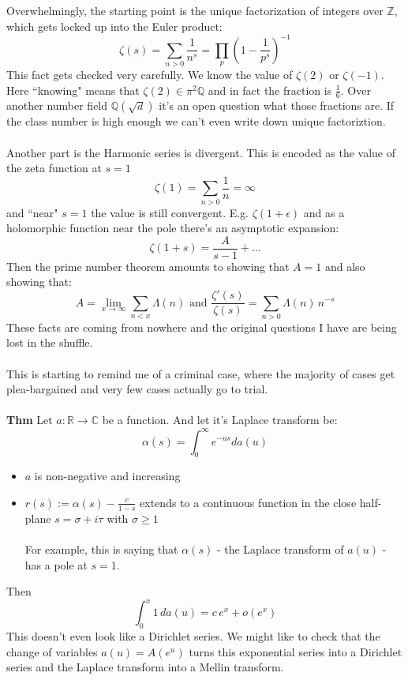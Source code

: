 \documentclass[12pt]{article}
\begin{document}
\newpage 

\noindent Overwhelmingly, the starting point is the unique factorization of integers over $\mathbb{Z}$, which gets locked up into the Euler product:
$$ \zeta(s) =  \sum_{n > 0} \frac{1}{n^s} = \prod_p \left( 1 - \frac{1}{p^s} \right)^{-1}$$
This fact gets checked very carefully.  We know the value of $\zeta(2)$ or $\zeta(-1)$.  Here ``knowing" means that $\zeta(2) \in \pi^2 \mathbb{Q}$ and in fact the fraction is $\frac{1}{6}$.  Over another number field $\mathbb{Q}(\sqrt{d})$ it's an open question what those fractions are.  If the class number is high enough we can't even write down unique factoriztion.  \\ \\
Another part is the Harmonic series is divergent.  This is encoded as the value of the zeta function at $s=1$
$$ \zeta(1) = \sum_{n > 0} \frac{1}{n} = \infty $$
and ``near" $s=1$ the value is still convergent.  E.g. $\zeta(1 + \epsilon)$ and as a holomorphic function near the pole there's an asymptotic expansion:
$$ \zeta(1 + s) = \frac{A}{s-1} + \dots  $$
Then the prime number theorem amounts to showing that $A = 1$ and also showing that:
$$ A = \lim_{x \to \infty} \sum_{n < x} \Lambda(n) \text{ and } \frac{\zeta'(s)}{\zeta(s)} = \sum_{n > 0} \Lambda(n) \, n^{-s}$$
These facts are coming from nowhere and the original questions I have are being lost in the shuffle. \\ \\
This is starting to remind me of a criminal case, where the majority of cases get plea-bargained and very few cases actually go to trial. \\ \\
\textbf{Thm} Let $a: \mathbb{R} \to \mathbb{C}$ be a function.  And let it's Laplace transform be:
$$ \alpha(s) = \int_0^\infty e^{-us} da(u) $$
\begin{itemize}
\item $a$ is non-negative and increasing
\item $r(s) := \alpha(s) - \frac{c}{1-s}$ extends to a continuous function in the close half-plane $s = \sigma + i \tau$ with $\sigma \geq 1$ \\ \\
For example, this is saying that $\alpha(s)$ - the Laplace transform of $a(u)$ - has a pole at $s = 1$.  
\end{itemize}
Then
$$ \int_0^x 1 \, da(u) = c \, e^x + o(e^x) $$
This doesn't even look like a Dirichlet series.  We might like to check that the change of variables $a(u) = A(e^u)$ turns this exponential series into a Dirichlet series and the Laplace transform into a Mellin transform.  \\ \\
\end{document}
